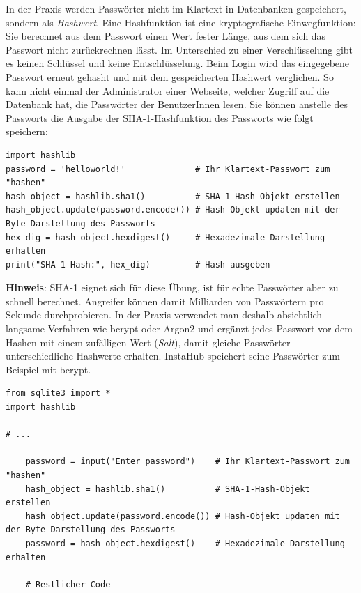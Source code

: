 \begin{mychallenge}
    In der Praxis werden Passwörter nicht im Klartext in Datenbanken gespeichert, sondern als \textit{Hashwert}. Eine Hashfunktion ist eine kryptografische Einwegfunktion: Sie berechnet aus dem Passwort einen Wert fester Länge, aus dem sich das Passwort nicht zurückrechnen lässt. Im Unterschied zu einer Verschlüsselung gibt es keinen Schlüssel und keine Entschlüsselung. Beim Login wird das eingegebene Passwort erneut gehasht und mit dem gespeicherten Hashwert verglichen. So kann nicht einmal der Administrator einer Webseite, welcher Zugriff auf die Datenbank hat, die Passwörter der BenutzerInnen lesen. Sie können anstelle des Passworts die Ausgabe der SHA-1-Hashfunktion des Passworts wie folgt speichern:
    \begin{lstlisting}
import hashlib
password = 'helloworld!'              # Ihr Klartext-Passwort zum "hashen"
hash_object = hashlib.sha1()          # SHA-1-Hash-Objekt erstellen
hash_object.update(password.encode()) # Hash-Objekt updaten mit der Byte-Darstellung des Passworts
hex_dig = hash_object.hexdigest()     # Hexadezimale Darstellung erhalten
print("SHA-1 Hash:", hex_dig)         # Hash ausgeben
\end{lstlisting}
    \textbf{Hinweis}: SHA-1 eignet sich für diese Übung, ist für echte Passwörter aber zu schnell berechnet. Angreifer können damit Milliarden von Passwörtern pro Sekunde durchprobieren. In der Praxis verwendet man deshalb absichtlich langsame Verfahren wie bcrypt oder Argon2 und ergänzt jedes Passwort vor dem Hashen mit einem zufälligen Wert (\textit{Salt}), damit gleiche Passwörter unterschiedliche Hashwerte erhalten. InstaHub speichert seine Passwörter zum Beispiel mit bcrypt.
    \begin{myanswer}
        \begin{lstlisting}
from sqlite3 import *
import hashlib

# ...

    password = input("Enter password")    # Ihr Klartext-Passwort zum "hashen"
    hash_object = hashlib.sha1()          # SHA-1-Hash-Objekt erstellen
    hash_object.update(password.encode()) # Hash-Objekt updaten mit der Byte-Darstellung des Passworts
    password = hash_object.hexdigest()    # Hexadezimale Darstellung erhalten

    # Restlicher Code
\end{lstlisting}
    \end{myanswer}
\end{mychallenge}

